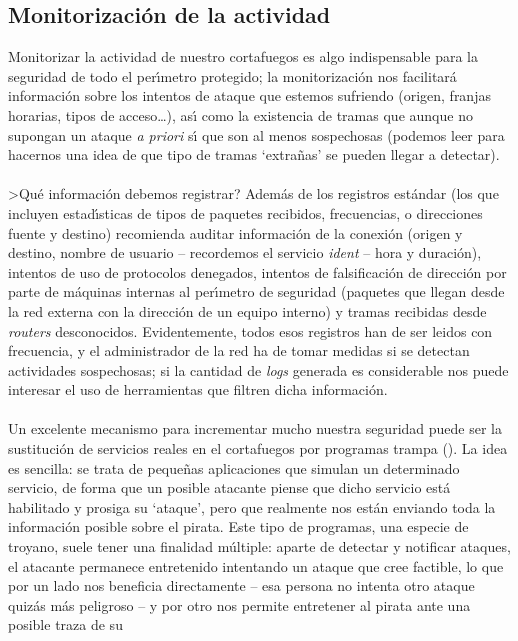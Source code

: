 \subsection{Monitorizaci\'on de la actividad}
Monitorizar la actividad de nuestro cortafuegos es algo indispensable para 
la seguridad de todo el per\'{\i}metro protegido; la monitorizaci\'on nos
facilitar\'a informaci\'on sobre los intentos de ataque que estemos sufriendo
(origen, franjas horarias, tipos de acceso\ldots), as\'{\i} como la existencia
de tramas que aunque no supongan un ataque {\it a priori} s\'{\i} que son al
menos sospechosas (podemos leer \cite{kn:bell93} para hacernos una idea de que
tipo de tramas `extra\~nas' se pueden llegar a detectar).\\
\\>Qu\'e informaci\'on debemos registrar? Adem\'as de los registros est\'andar
(los que incluyen estad\'{\i}sticas de tipos de paquetes recibidos, frecuencias,
o direcciones fuente y destino) \cite{kn:open} recomienda auditar informaci\'on
de la conexi\'on (origen y destino, nombre de usuario -- recordemos el servicio
{\it ident} -- hora y duraci\'on), intentos de uso de protocolos denegados,
intentos de falsificaci\'on de direcci\'on por parte de m\'aquinas internas al 
per\'{\i}metro de seguridad (paquetes que llegan desde la red externa con la 
direcci\'on de un equipo interno) y tramas recibidas desde {\it routers} 
desconocidos. Evidentemente, todos esos registros han de ser leidos con
frecuencia, y el administrador de la red ha de tomar medidas si se detectan
actividades sospechosas; si la cantidad de {\it logs} generada es considerable
nos puede interesar el uso de herramientas que filtren dicha informaci\'on.\\
\\Un excelente mecanismo para incrementar mucho nuestra seguridad puede ser 
la sustituci\'on de servicios reales en el cortafuegos por programas trampa
(\cite{kn:bel92}). La idea es sencilla: se trata de peque\~nas aplicaciones que 
simulan un determinado servicio, de forma que un posible atacante piense que 
dicho servicio est\'a habilitado y prosiga su `ataque', pero que realmente nos
est\'an enviando toda la informaci\'on posible sobre el pirata. Este tipo de 
programas, una especie de troyano, suele tener una finalidad m\'ultiple:
aparte de detectar y notificar ataques, el atacante permanece entretenido 
intentando un ataque que cree factible, lo que por un lado nos beneficia 
directamente -- esa persona no intenta otro ataque quiz\'as m\'as peligroso -- 
y por otro nos permite entretener al pirata ante una posible traza de su
